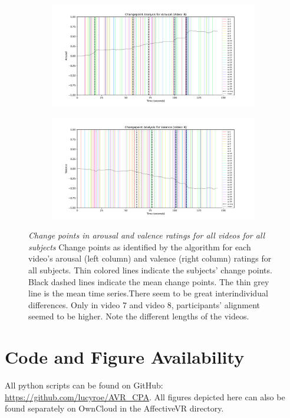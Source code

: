 \documentclass[11pt, letterpaper]{article}
\begin{document}
\begin{figure}
        \centering
    \begin{subfigure}[t]{0.49\textwidth}
        \centering
        \includegraphics[width=\linewidth]{changepoints_V8_arousal_avg} 
        \caption{} \label{fig:changepoints_V8_arousal_avg}
    \end{subfigure}
    \hfill
    \begin{subfigure}[t]{0.49\textwidth}
        \centering
        \includegraphics[width=\linewidth]{changepoints_V8_valence_avg} 
        \caption{} \label{fig:changepoints_V8_valence_avg}
    \end{subfigure}
    
    \caption{\textit{Change points in arousal and valence ratings for all videos for all subjects} Change points as identified by the algorithm for each video's arousal (left column) and valence (right column) ratings for all subjects. Thin colored lines indicate the subjects' change points. Black dashed lines indicate the mean change points. The thin grey line is the mean time series.There seem to be great interindividual differences. Only in video 7 and video 8, participants' alignment seemed to be higher. Note the different lengths of the videos.}
    \label{fig:all}
\end{figure}

\section{Code and Figure Availability} \label{code}
All python scripts can be found on GitHub: 
\url{https://github.com/lucyroe/AVR_CPA}.
All figures depicted here can also be found separately on OwnCloud in the AffectiveVR directory.
\end{document}
